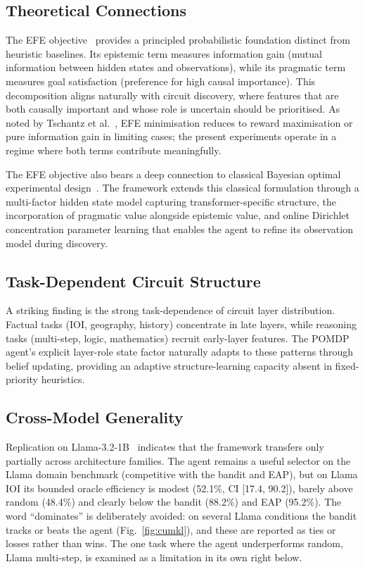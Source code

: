 \subsection{Theoretical Connections}

The EFE objective~\cite{DaCosta2020} provides a principled probabilistic foundation distinct from heuristic baselines. Its epistemic term measures information gain (mutual information between hidden states and observations), while its pragmatic term measures goal satisfaction (preference for high causal importance). This decomposition aligns naturally with circuit discovery, where features that are both causally important and whose role is uncertain should be prioritised. As noted by Tschantz et al.~\cite{Tschantz2020}, EFE minimisation reduces to reward maximisation or pure information gain in limiting cases; the present experiments operate in a regime where both terms contribute meaningfully.

The EFE objective also bears a deep connection to classical Bayesian optimal experimental design~\cite{MacKay2003}. The \ACD{} framework extends this classical formulation through a multi-factor hidden state model capturing transformer-specific structure, the incorporation of pragmatic value alongside epistemic value, and online Dirichlet concentration parameter learning that enables the agent to refine its observation model during discovery.

\subsection{Task-Dependent Circuit Structure}

A striking finding is the strong task-dependence of circuit layer distribution. Factual tasks (IOI, geography, history) concentrate in late layers, while reasoning tasks (multi-step, logic, mathematics) recruit early-layer features. The POMDP agent's explicit layer-role state factor naturally adapts to these patterns through belief updating, providing an adaptive structure-learning capacity absent in fixed-priority heuristics.

\subsection{Cross-Model Generality}

Replication on Llama-3.2-1B~\cite{Dubey2024llama} indicates that the framework
transfers only partially across architecture families. The agent remains a useful
selector on the Llama domain benchmark (competitive with the bandit and EAP), but on
Llama IOI its bounded oracle efficiency is modest (52.1\%, CI [17.4, 90.2]), barely
above random (48.4\%) and clearly below the bandit (88.2\%) and EAP (95.2\%). The
word ``dominates'' is deliberately avoided: on several Llama conditions the bandit
tracks or beats the agent (Fig.~\ref{fig:cumkl}), and these are reported as ties or
losses rather than wins. The one task where the agent underperforms random,
Llama multi-step, is examined as a limitation in its own right below.

